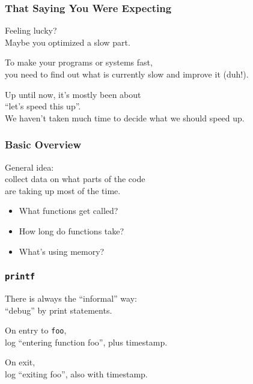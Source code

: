 \begin{frame}
\frametitle{That Saying You Were Expecting}

\Large
\begin{changemargin}{1.5cm}
Feeling lucky? \\
Maybe you optimized a slow part. 

To make your programs or systems fast, \\
you need to find out what is currently slow and improve it (duh!). 

Up until now, it's mostly been about \\
\qquad ``let's speed this up''.\\
We haven't taken much time to decide what we should speed up.
\end{changemargin}

\end{frame}



\begin{frame}
\frametitle{Basic Overview}

\Large
\begin{changemargin}{1.5cm}
General idea:\\
\qquad collect data on what parts of the code\\
\qquad are taking up most of the time.

\begin{itemize}
\item What functions get called?
\item How long do functions take?
\item What's using memory?
\end{itemize}
\end{changemargin}

\end{frame}



\begin{frame}
\frametitle{\texttt{printf}}

\Large
\begin{changemargin}{1.5cm}
There is always the ``informal'' way:\\

\qquad ``debug'' by print statements.

On entry to \texttt{foo}, \\
log ``entering function foo'', plus timestamp.

On exit, \\
log ``exiting foo'', also with timestamp.
\end{changemargin}


\end{frame}



